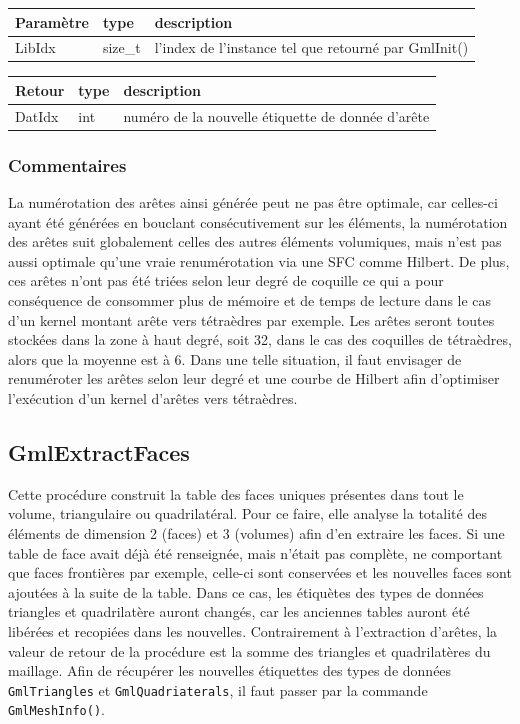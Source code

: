 \documentclass[a4paper,12pt]{article}
\begin{document}
\begin{tabular}{|m{2cm}|m{1.5cm}|m{10.5cm}|}
\hline
Paramètre  & type    & description \\
\hline
LibIdx     & size\_t & l'index de l'instance tel que retourné par GmlInit() \\
\hline
\end{tabular}

\medskip

\begin{tabular}{|m{2cm}|m{1.5cm}|m{10.5cm}|}
\hline
Retour     & type   & description \\
\hline
DatIdx     & int    & numéro de la nouvelle étiquette de donnée d'arête\\
\hline
\end{tabular}

\subsubsection*{Commentaires}
La numérotation des arêtes ainsi générée peut ne pas être optimale, car celles-ci ayant été générées en bouclant consécutivement sur les éléments, la numérotation des arêtes suit globalement celles des autres éléments volumiques, mais n'est pas aussi optimale qu'une vraie renumérotation via une SFC comme Hilbert.
De plus, ces arêtes n'ont pas été triées selon leur degré de coquille ce qui a pour conséquence de consommer plus de mémoire et de temps de lecture dans le cas d'un kernel montant arête vers tétraèdres par exemple.
Les arêtes seront toutes stockées dans la zone à haut degré, soit 32, dans le cas des coquilles de tétraèdres, alors que la moyenne est à 6.
Dans une telle situation, il faut envisager de renuméroter les arêtes selon leur degré et une courbe de Hilbert afin d’optimiser l'exécution d'un kernel d'arêtes vers tétraèdres.


\subsection{GmlExtractFaces}
Cette procédure construit la table des faces uniques présentes dans tout le volume, triangulaire ou quadrilatéral.
Pour ce faire, elle analyse la totalité des éléments de dimension 2 (faces) et 3 (volumes) afin d'en extraire les faces.
Si une table de face avait déjà été renseignée, mais n'était pas complète, ne comportant que faces frontières par exemple, celle-ci sont conservées et les nouvelles faces sont ajoutées à la suite de la table. Dans ce cas, les étiquètes des types de données triangles et quadrilatère auront changés, car les anciennes tables auront été libérées et recopiées dans les nouvelles. Contrairement à l'extraction d'arêtes, la valeur de retour de la procédure est la somme des triangles et quadrilatères du maillage. Afin de récupérer les nouvelles étiquettes des types de données {\tt GmlTriangles} et {\tt GmlQuadriaterals}, il faut passer par la commande {\tt GmlMeshInfo()}.
\end{document}
